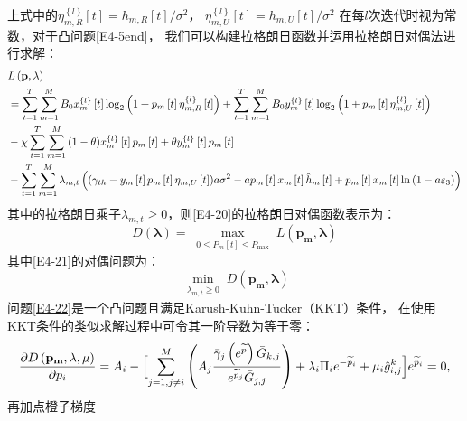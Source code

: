上式中的$\eta_{m,R}^{\left\{ l \right\}}\left[t\right]=h_{m,R}\left[t\right]/{\sigma^2}$，
$\eta_{m,U}^{\left\{ l \right\}}\left[t\right]=h_{m,U}\left[t\right]/{\sigma^2}$
在每$l$次迭代时视为常数，对于凸问题\eqref{E4-5end}，
我们可以构建拉格朗日函数并运用拉格朗日对偶法进行求解：
\begin{align}\label{E4-20}
&L\left(\mathbf{p},\lambda\right)\\
&=\sum_{t=1}^T \sum_{m=1}^M {B}_{0}x_{m}^{\left\{ l \right\}}\left[ t \right] %
\log_2{\left(1+p_m\left[t\right]\eta_{m,R}^{\left\{ l \right\}}\left[t\right]\right)}+                                                      \notag
\sum_{t=1}^T \sum_{m=1}^M {B}_{0}y_{m}^{\left\{ l \right\}}\left[ t \right]
\log_2{\left(1+p_m\left[t\right]\eta_{m,U}^{\left\{ l \right\}}\left[t\right]\right)}                     \\                                \notag
&-\chi \sum_{t=1}^T \sum_{m=1}^M{(1-\theta)x_{m}^{\left\{ l \right\}}\left[ t \right]p_m\left[t\right]
+\theta y_{m}^{\left\{ l \right\}}\left[ t \right]p_m\left[t\right]} \\
&-\sum\limits_{t=1}^{T}{\sum\limits_{m=1}^{M}{{{\lambda }_{m,t}}}}\left( ({{\gamma }_{th}}-{{y}_{m}}\left[ t \right]{{p}_{m}}\left[ t \right]{{\eta }_{m,U}}\left[ t \right])a{{\sigma }^{2}}-a{{p}_{m}}\left[ t \right]{{x}_{m}}\left[ t \right]{{{\hat{h}}}_{m}}\left[ t \right]+{{p}_{m}}\left[ t \right]{{x}_{m}}\left[ t \right]\ln \left( 1-a{{\varepsilon }_{3}} \right) \right)                                                                 \notag
\end{align}
其中的拉格朗日乘子$\lambda_{m,t}\geq 0$，则\eqref{E4-20}的拉格朗日对偶函数表示为：
\begin{equation} \label{E4-21}
D(\mathbf{\lambda})=\max _{\substack{0 \leq P_m[t] \leq P_{\max }}} L\left(\mathbf{p_m},\mathbf{\lambda}\right)
\end{equation}
其中\eqref{E4-21}的对偶问题为：
\begin{equation} \label{E4-22}
\min_{\substack{\lambda_{m,t}\geq 0}} D\left(\mathbf{p_m},\mathbf{\lambda}\right)
\end{equation}
问题\eqref{E4-22}是一个凸问题且满足Karush-Kuhn-Tucker（KKT）条件，
在使用KKT条件的类似求解过程中可令其一阶导数为等于零：
\begin{align}\label{E22add}
\frac{\partial D\left(\mathbf{p_m},\lambda,\mu\right)}{\partial p_i}=A_i-\Bigl[\sum_{j=1,j\neq i}^{M}\left(A_j\frac{{\bar{\gamma}}_j\left(e^{\widetilde{p}}\right){\bar{G}}_{k,j}}{e^{{\widetilde{p}}_j}{\bar{G}}_{j,j}}\right)
+\lambda_i\mathrm{\Pi}_ie^{-{\widetilde{p}}_i}+\mu_i{\hat{g}}_{i,j}^k\Bigl]e^{{\widetilde{p}}_i}=0,
\end{align}
\textcolor[RGB]{202,12,22}{再加点橙子梯度}
